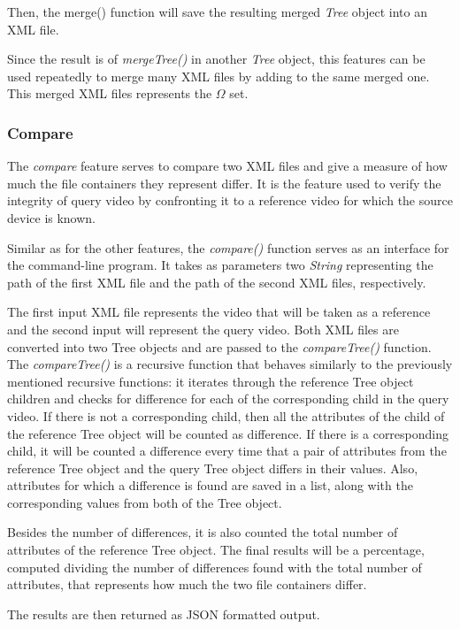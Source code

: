 Then, the merge() function will save the resulting merged \emph{Tree} object into an XML file.

Since the result is of \emph{mergeTree()} in another \emph{Tree} object, this features can be used repeatedly to merge many XML files by adding to the same merged one. This merged XML files represents the $\Omega$ set.

\subsubsection{Compare}

The \emph{compare} feature serves to compare two XML files and give a measure of how much the file containers they represent differ. It is the feature used to verify the integrity of query video by confronting it to a reference video for which the source device is known.

Similar as for the other features, the \emph{compare()} function serves as an interface for the command-line program. It takes as parameters two \emph{String} representing the path of the first XML file and the path of the second XML files, respectively.

The first input XML file represents the video that will be taken as a reference and the second input will represent the query video. Both XML files are converted into two Tree objects and are passed to the \emph{compareTree()} function. The \emph{compareTree()} is a recursive function that behaves similarly to the previously mentioned recursive functions: it iterates through the reference Tree object children and checks for difference for each of the corresponding child in the query video. If there is not a corresponding child, then all the attributes of the child of the reference Tree object will be counted as difference. If there is a corresponding child, it will be counted a difference every time that a pair of attributes from the reference Tree object and the query Tree object differs in their values. Also, attributes for which a difference is found are saved in a list, along with the corresponding values from both of the Tree object.

Besides the number of differences, it is also counted the total number of attributes of the reference Tree object. The final results will be a percentage, computed dividing the number of differences found with the total number of attributes, that represents how much the two file containers differ.

The results are then returned as JSON formatted output.

